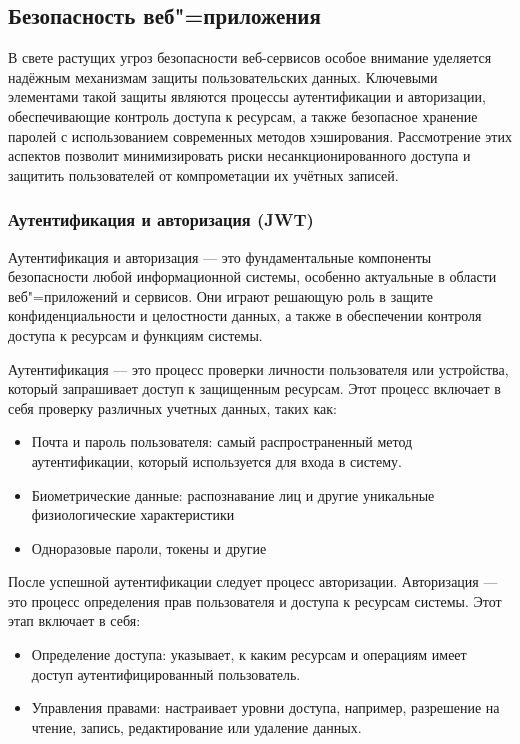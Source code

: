 \subsection{Безопасность веб"=приложения}

В свете растущих угроз безопасности веб-сервисов особое внимание уделяется надёжным механизмам защиты пользовательских данных. Ключевыми элементами такой защиты являются процессы аутентификации и авторизации, обеспечивающие контроль доступа к ресурсам, а также безопасное хранение паролей с использованием современных методов хэширования. Рассмотрение этих аспектов позволит минимизировать риски несанкционированного доступа и защитить пользователей от компрометации их учётных записей.

\subsubsection{Аутентификация и авторизация (JWT)}

Аутентификация и авторизация --- это фундаментальные компоненты безопасности любой информационной системы, особенно актуальные в области веб"=приложений и сервисов. Они играют решающую роль в защите конфиденциальности и целостности данных, а также в обеспечении контроля доступа к ресурсам и функциям системы.

Аутентификация --- это процесс проверки личности пользователя или устройства, который запрашивает доступ к защищенным ресурсам. Этот процесс включает в себя проверку различных учетных данных, таких как:
\begin{itemize}
	\item{Почта и пароль пользователя: самый распространенный метод аутентификации, который используется для входа в систему.}
	\item{Биометрические данные: распознавание лиц и другие уникальные физиологические характеристики}
	\item{Одноразовые пароли, токены и другие}
\end{itemize}

После успешной аутентификации следует процесс авторизации. Авторизация --- это процесс определения прав пользователя и доступа к ресурсам системы. Этот этап включает в себя:
\begin{itemize}
	\item{Определение доступа: указывает, к каким ресурсам и операциям имеет доступ аутентифицированный пользователь.}
	\item{Управления правами: настраивает уровни доступа, например, разрешение на чтение, запись, редактирование или удаление данных.}
\end{itemize}

